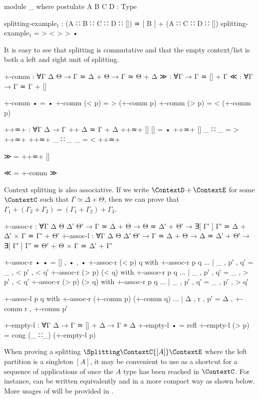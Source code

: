 \begin{code}[hide]
module _ where
  postulate A B C D : Type
\end{code}
\begin{code}
  splitting-example₁ : (A ∷ B ∷ C ∷ D ∷ []) ≃ [ B ] + (A ∷ C ∷ D ∷ [])
  splitting-example₁ = > < > > •
\end{code}

It is easy to see that splitting is commutative and that the empty context/list
is both a left and right unit of splitting.

\begin{code}
+-comm    : ∀{Γ Δ Θ} → Γ ≃ Δ + Θ → Γ ≃ Θ + Δ
≫         : ∀{Γ} → Γ ≃ [] + Γ
≪         : ∀{Γ} → Γ ≃ Γ + []
\end{code}
\begin{code}[hide]
+-comm • = •
+-comm (< p) = > (+-comm p)
+-comm (> p) = < (+-comm p)

++≃+ : ∀{Γ Δ} → Γ ++ Δ ≃ Γ + Δ
++≃+ {[]}    {[]}    = •
++≃+ {[]}    {_ ∷ _} = > ++≃+
++≃+ {_ ∷ _} {_}     = < ++≃+

≫ = ++≃+ {[]}

≪ = +-comm ≫
\end{code}

Context splitting is also associative. If we write $\ContextD + \ContextE$ for
some $\ContextC$ such that $Γ ≃ Δ + Θ$, then we can prove that $Γ_1 + (Γ_2 +
Γ_3) = (Γ_1 + Γ_2) + Γ_3$.

\begin{code}
+-assoc-r  : ∀{Γ Δ Θ Δ′ Θ′} → Γ ≃ Δ + Θ → Θ ≃ Δ′ + Θ′ →
             ∃[ Γ′ ] Γ′ ≃ Δ + Δ′ × Γ ≃ Γ′ + Θ′
+-assoc-l  : ∀{Γ Δ Θ Δ′ Θ′} → Γ ≃ Δ + Θ → Δ ≃ Δ′ + Θ′ →
             ∃[ Γ′ ] Γ′ ≃ Θ′ + Θ × Γ ≃ Δ′ + Γ′
\end{code}
\begin{code}[hide]
+-assoc-r • • = [] , • , •
+-assoc-r (< p) q with +-assoc-r p q
... | _ , p′ , q′ = _ , < p′ , < q′
+-assoc-r (> p) (< q) with +-assoc-r p q
... | _ , p′ , q′ = _ , > p′ , < q′
+-assoc-r (> p) (> q) with +-assoc-r p q
... | _ , p′ , q′ = _ , p′ , > q′

+-assoc-l p q with +-assoc-r (+-comm p) (+-comm q)
... | Δ , r , p′ = Δ , +-comm r , +-comm p′
\end{code}

\begin{code}[hide]
+-empty-l : ∀{Γ Δ} → Γ ≃ [] + Δ → Γ ≡ Δ
+-empty-l • = refl
+-empty-l (> p) = cong (_ ∷_) (+-empty-l p)
\end{code}

When proving a splitting $\Splitting\ContextC{[A]}\ContextE$ where the left
partition is a singleton $[A]$, it may be convenient to use  as
a shortcut for a sequence of applications of \AgdaInductiveConstructor{>} once
the $A$ type has been reached in $\ContextC$. For instance,
 can be written equivalently and in a more
compact way as shown below. More usages of  will be provided in
.

